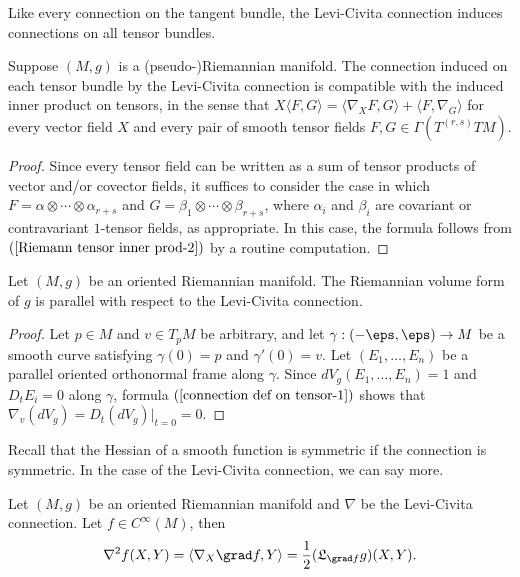 Like every connection on the tangent bundle, the Levi-Civita connection induces connections on all tensor bundles.
\begin{proposition}\label{Levi-Civita volume form parallel}
Suppose $(M,g)$ is a (pseudo-)Riemannian manifold. The connection induced on each tensor bundle by the Levi-Civita connection is compatible with the induced inner product on tensors, in the sense that $X\langle F,G\rangle=\langle\nabla_XF,G\rangle+\langle F,\nabla_G\rangle$ for every vector field $X$ and every pair of smooth tensor fields $F,G\in\Gamma(T^{(r,s)}TM)$.
\end{proposition}
\begin{proof}
Since every tensor field can be written as a sum of tensor products of vector and/or covector fields, it suffices to consider the case in which $F=\alpha\otimes\cdots\otimes\alpha_{r+s}$ and $G=\beta_1\otimes\cdots\otimes\beta_{r+s}$, where $\alpha_i$ and $\beta_i$ are covariant or contravariant $1$-tensor fields, as appropriate. In this case, the formula follows from $(\ref{Riemann tensor inner prod-2})$ by a routine computation.
\end{proof}
\begin{proposition}\label{Riemann volume form parallel}
Let $(M,g)$ be an oriented Riemannian manifold. The Riemannian volume form of $g$ is parallel with respect to the Levi-Civita connection.
\end{proposition}
\begin{proof}
Let $p\in M$ and $v\in T_pM$ be arbitrary, and let $\gamma:(-\eps,\eps)\to M$ be a smooth curve satisfying $\gamma(0)=p$ and $\gamma'(0)=v$. Let $(E_1,\dots,E_n)$ be a 
parallel oriented orthonormal frame along $\gamma$. Since $dV_g(E_1,\dots,E_n)=1$ and $D_tE_i=0$ along $\gamma$, formula $(\ref{connection def on tensor-1})$ shows that 
$\nabla_v(dV_g)=D_t(dV_g)|_{t=0}=0$.
\end{proof}
Recall that the Hessian of a smooth function is symmetric if the connection is symmetric. In the case of the Levi-Civita connection, we can say more.
\begin{proposition}\label{Riemann Hession Lie derivative}
Let $(M,g)$ be an oriented Riemannian manifold and $\nabla$ be the Levi-Civita connection. Let $f\in C^{\infty}(M)$, then
\[\nabla^2f(X,Y)=\langle\nabla_X\grad f,Y\rangle=\frac{1}{2}(\mathfrak{L}_{\grad f}g)(X,Y).\]
\end{proposition}
